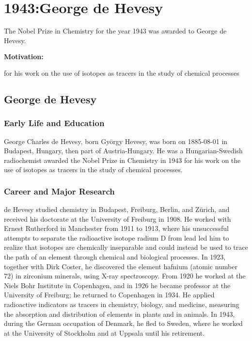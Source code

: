 \chapter{1943:George de Hevesy}

\label{chap:chemistry1943}

The Nobel Prize in Chemistry for the year 1943 was awarded to George de Hevesy.

\textbf{Motivation:}

for his work on the use of isotopes as tracers in the study of chemical processes

\section{George de Hevesy}

\subsection*{Early Life and Education}

George Charles de Hevesy, born György Hevesy, was born on 1885-08-01 in Budapest, Hungary, then part of Austria-Hungary.
He was a Hungarian-Swedish radiochemist awarded the Nobel Prize in Chemistry in 1943 for his work on the use of isotopes as tracers in the study of chemical processes.

\subsection*{Career and Major Research}

de Hevesy studied chemistry in Budapest, Freiburg, Berlin, and Zürich, and received his doctorate at the University of Freiburg in 1908.
He worked with Ernest Rutherford in Manchester from 1911 to 1913, where his unsuccessful attempts to separate the radioactive isotope radium D from lead led him to realize that isotopes are chemically inseparable and could instead be used to trace the path of an element through chemical and biological processes.
In 1923, together with Dirk Coster, he discovered the element hafnium (atomic number 72) in zirconium minerals, using X-ray spectroscopy.
From 1920 he worked at the Niels Bohr Institute in Copenhagen, and in 1926 he became professor at the University of Freiburg; he returned to Copenhagen in 1934.
He applied radioactive indicators as tracers in chemistry, biology, and medicine, measuring the absorption and distribution of elements in plants and in animals.
In 1943, during the German occupation of Denmark, he fled to Sweden, where he worked at the University of Stockholm and at Uppsala until his retirement.

